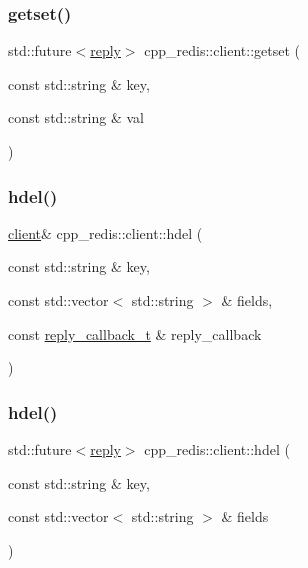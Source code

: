 \subsubsection{\texorpdfstring{getset()}{getset()}\hspace{0.1cm}{\footnotesize\ttfamily [2/2]}}
{\footnotesize\ttfamily std\+::future$<$\hyperlink{classcpp__redis_1_1reply}{reply}$>$ cpp\+\_\+redis\+::client\+::getset (\begin{DoxyParamCaption}\item[{const std\+::string \&}]{key,  }\item[{const std\+::string \&}]{val }\end{DoxyParamCaption})}

\mbox{\label{classcpp__redis_1_1client_adc62af1a2d07d04fbf274f98f374ab47}} 
\subsubsection{\texorpdfstring{hdel()}{hdel()}\hspace{0.1cm}{\footnotesize\ttfamily [1/2]}}
{\footnotesize\ttfamily \hyperlink{classcpp__redis_1_1client}{client}\& cpp\+\_\+redis\+::client\+::hdel (\begin{DoxyParamCaption}\item[{const std\+::string \&}]{key,  }\item[{const std\+::vector$<$ std\+::string $>$ \&}]{fields,  }\item[{const \hyperlink{classcpp__redis_1_1client_a061a1140d36d2eaeda82b09a0bb3f9f2}{reply\+\_\+callback\+\_\+t} \&}]{reply\+\_\+callback }\end{DoxyParamCaption})}

\mbox{\label{classcpp__redis_1_1client_a56d4df4d31ffc56e097a8a78cb85d861}} 
\subsubsection{\texorpdfstring{hdel()}{hdel()}\hspace{0.1cm}{\footnotesize\ttfamily [2/2]}}
{\footnotesize\ttfamily std\+::future$<$\hyperlink{classcpp__redis_1_1reply}{reply}$>$ cpp\+\_\+redis\+::client\+::hdel (\begin{DoxyParamCaption}\item[{const std\+::string \&}]{key,  }\item[{const std\+::vector$<$ std\+::string $>$ \&}]{fields }\end{DoxyParamCaption})}

